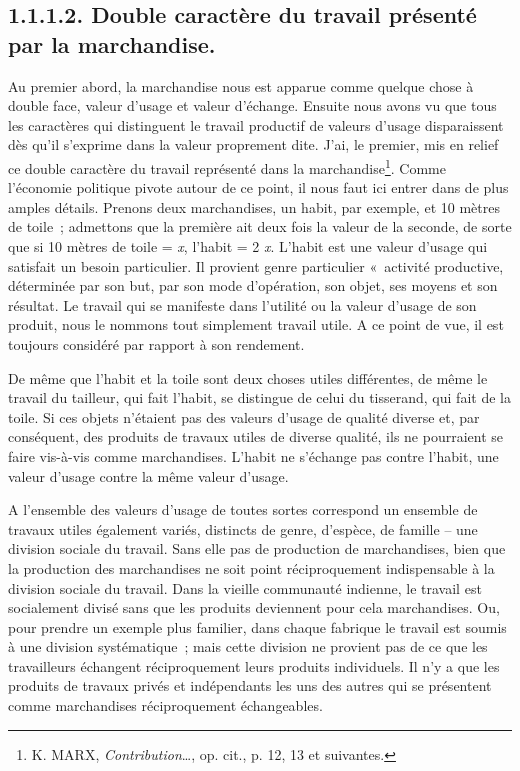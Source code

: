 \documentclass[french,twoside]{book} %
\begin{document}
\subsection[{1.1.1.2. Double caractère du travail présenté par la marchandise.}]{1.1.1.2. Double caractère du travail présenté par la marchandise.}
\noindent Au premier abord, la marchandise nous est apparue comme quelque chose à double face, valeur d’usage et valeur d’échange. Ensuite nous avons vu que tous les caractères qui distinguent le travail productif de valeurs d’usage disparaissent dès qu’il s’exprime dans la valeur proprement dite. J’ai, le premier, mis en relief ce double caractère du travail représenté dans la marchandise\footnote{K. MARX, \emph{Contribution}…, op. cit., p. 12, 13 et suivantes.}. Comme l’économie politique pivote autour de ce point, il nous faut ici entrer dans de plus amples détails. Prenons deux marchandises, un habit, par exemple, et 10 mètres de toile ; admettons que la première ait deux fois la valeur de la seconde, de sorte que si 10 mètres de toile = \emph{x}, l’habit = 2 \emph{x}. L’habit est une valeur d’usage qui satisfait un besoin particulier. Il provient genre particulier « activité productive, déterminée par son but, par son mode d’opération, son objet, ses moyens et son résultat. Le travail qui se manifeste dans l’utilité ou la valeur d’usage de son produit, nous le nommons tout simplement travail utile. A ce point de vue, il est toujours considéré par rapport à son rendement.\par
De même que l’habit et la toile sont deux choses utiles différentes, de même le travail du tailleur, qui fait l’habit, se distingue de celui du tisserand, qui fait de la toile. Si ces objets n’étaient pas des valeurs d’usage de qualité diverse et, par conséquent, des produits de travaux utiles de diverse qualité, ils ne pourraient se faire vis-à-vis comme marchandises. L’habit ne s’échange pas contre l’habit, une valeur d’usage contre la même valeur d’usage.\par
A l’ensemble des valeurs d’usage de toutes sortes correspond un ensemble de travaux utiles également variés, distincts de genre, d’espèce, de famille – une division sociale du travail. Sans elle pas de production de marchandises, bien que la production des marchandises ne soit point réciproquement indispensable à la division sociale du travail. Dans la vieille communauté indienne, le travail est socialement divisé sans que les produits deviennent pour cela marchandises. Ou, pour prendre un exemple plus familier, dans chaque fabrique le travail est soumis à une division systématique ; mais cette division ne provient pas de ce que les travailleurs échangent réciproquement leurs produits individuels. Il n’y a que les produits de travaux privés et indépendants les uns des autres qui se présentent comme marchandises réciproquement échangeables.\par
\end{document}
